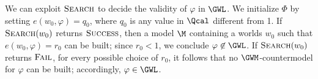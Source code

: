 We can exploit $\textsc{Search}$ to  decide the validity of $\varphi$ in $\GWL$.
We initialize $\Phi$ by setting $e(w_0,\varphi)= q_0$,
where $q_0$ is any value in $\Qcal$ different from 1.
If   $\textsc{Search}(w_0)$ returns $\textsc{Success}$, then a model $\M$ containing a worlds $w_0$ such that
$e(w_0,\varphi)=r_0$ can be built; since $r_0 < 1$, we conclude $\varphi\not\in \GWL$.
If   $\textsc{Search}(w_0)$ returns $\textsc{Fail}$, for every possible choice of $r_0$, it follows
that no $\GWM$-countermodel for $\varphi$ can be built; accordingly, 
$\varphi\in \GWL$.











